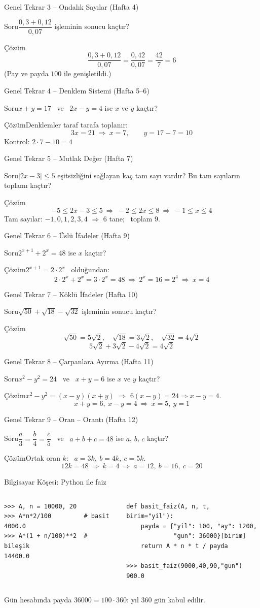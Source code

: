 \documentclass[aspectratio=169,11pt]{beamer}
\newcommand{\soru}[3]{%
\begin{frame}{#1}
  \begin{block}{Soru}\large #2\end{block}
  \pause
  \begin{exampleblock}{Çözüm}\large #3\end{exampleblock}
\end{frame}}
\begin{document}
\soru{Genel Tekrar 3 -- Ondalık Sayılar (Hafta 4)}
{\(\dfrac{0{,}3+0{,}12}{0{,}07}\) işleminin sonucu kaçtır?}
{\[\frac{0{,}3+0{,}12}{0{,}07}=\frac{0{,}42}{0{,}07}=\frac{42}{7}=6\]
(Pay ve payda \(100\) ile genişletildi.)}

\soru{Genel Tekrar 4 -- Denklem Sistemi (Hafta 5--6)}
{\(x+y=17\) \ ve \ \(2x-y=4\) ise \(x\) ve \(y\) kaçtır?}
{Denklemler taraf tarafa toplanır:
\[3x=21\ \Rightarrow\ x=7,\qquad y=17-7=10\]
Kontrol: \(2\cdot 7-10=4\) \checkmark}

\soru{Genel Tekrar 5 -- Mutlak Değer (Hafta 7)}
{\(|2x-3|\le 5\) eşitsizliğini sağlayan kaç tam sayı vardır? Bu tam sayıların toplamı kaçtır?}
{\[-5\le 2x-3\le 5\ \Rightarrow\ -2\le 2x\le 8\ \Rightarrow\ -1\le x\le 4\]
Tam sayılar: \(-1,0,1,2,3,4\) \(\Rightarrow\) \(6\) tane; \ toplam \(9\).}

\soru{Genel Tekrar 6 -- Üslü İfadeler (Hafta 9)}
{\(2^{x+1}+2^{x}=48\) ise \(x\) kaçtır?}
{\(2^{x+1}=2\cdot 2^x\) \ olduğundan:
\[2\cdot 2^x+2^x=3\cdot 2^x=48\ \Rightarrow\ 2^x=16=2^4\ \Rightarrow\ x=4\]}

\soru{Genel Tekrar 7 -- Köklü İfadeler (Hafta 10)}
{\(\sqrt{50}+\sqrt{18}-\sqrt{32}\) işleminin sonucu kaçtır?}
{\[\sqrt{50}=5\sqrt{2},\quad \sqrt{18}=3\sqrt{2},\quad \sqrt{32}=4\sqrt{2}\]
\[5\sqrt{2}+3\sqrt{2}-4\sqrt{2}=4\sqrt{2}\]}

\soru{Genel Tekrar 8 -- Çarpanlara Ayırma (Hafta 11)}
{\(x^2-y^2=24\) \ ve \ \(x+y=6\) ise \(x\) ve \(y\) kaçtır?}
{\(x^2-y^2=(x-y)(x+y)\) \(\Rightarrow\) \(6(x-y)=24\Rightarrow x-y=4\).
\[x+y=6,\ x-y=4\ \Rightarrow\ x=5,\ y=1\]}

\soru{Genel Tekrar 9 -- Oran -- Orantı (Hafta 12)}
{\(\dfrac{a}{3}=\dfrac{b}{4}=\dfrac{c}{5}\) \ ve \ \(a+b+c=48\) ise \(a\), \(b\), \(c\) kaçtır?}
{Ortak oran \(k\): \ \(a=3k,\ b=4k,\ c=5k\).
\[12k=48\ \Rightarrow\ k=4\ \Rightarrow\ a=12,\ b=16,\ c=20\]}

\begin{frame}[fragile]{Bilgisayar Köşesi: Python ile faiz}
\begin{columns}[t]
\small
\begin{verbatim}
>>> A, n = 10000, 20
>>> A*n*2/100         # basit
4000.0
>>> A*(1 + n/100)**2  # bileşik
14400.0
\end{verbatim}
\small
\begin{verbatim}
def basit_faiz(A, n, t, birim="yil"):
    payda = {"yil": 100, "ay": 1200,
             "gun": 36000}[birim]
    return A * n * t / payda

>>> basit_faiz(9000,40,90,"gun")
900.0
\end{verbatim}
\end{columns}
\small Gün hesabında payda \(36000=100\cdot 360\): yıl \(360\) gün kabul edilir.
\end{frame}
\end{document}

